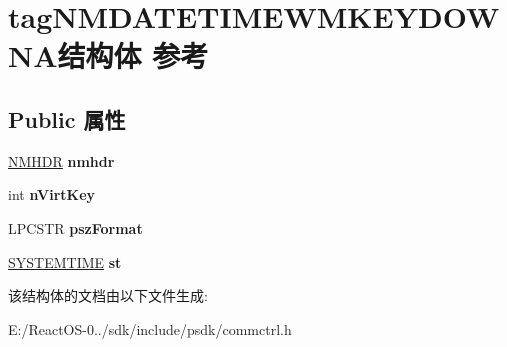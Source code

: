 \hypertarget{structtag_n_m_d_a_t_e_t_i_m_e_w_m_k_e_y_d_o_w_n_a}{}\section{tag\+N\+M\+D\+A\+T\+E\+T\+I\+M\+E\+W\+M\+K\+E\+Y\+D\+O\+W\+N\+A结构体 参考}
\label{structtag_n_m_d_a_t_e_t_i_m_e_w_m_k_e_y_d_o_w_n_a}
\subsection*{Public 属性}
\begin{DoxyCompactItemize}
\item 
\mbox{\label{structtag_n_m_d_a_t_e_t_i_m_e_w_m_k_e_y_d_o_w_n_a_a51992d95d2472628369f2fd306456f4c}} 
\hyperlink{structtag_n_m_h_d_r}{N\+M\+H\+DR} {\bfseries nmhdr}
\item 
\mbox{\label{structtag_n_m_d_a_t_e_t_i_m_e_w_m_k_e_y_d_o_w_n_a_a07d54f2d3ed22ee09dde20fb07ee6c96}} 
int {\bfseries n\+Virt\+Key}
\item 
\mbox{\label{structtag_n_m_d_a_t_e_t_i_m_e_w_m_k_e_y_d_o_w_n_a_a84e18c8d0edf326977077c23a7e81741}} 
L\+P\+C\+S\+TR {\bfseries psz\+Format}
\item 
\mbox{\label{structtag_n_m_d_a_t_e_t_i_m_e_w_m_k_e_y_d_o_w_n_a_a7a1e8337ee32064420e6803560d22b5c}} 
\hyperlink{struct___s_y_s_t_e_m_t_i_m_e}{S\+Y\+S\+T\+E\+M\+T\+I\+ME} {\bfseries st}
\end{DoxyCompactItemize}


该结构体的文档由以下文件生成\+:\begin{DoxyCompactItemize}
\item 
E\+:/\+React\+O\+S-\/0../sdk/include/psdk/commctrl.\+h\end{DoxyCompactItemize}

